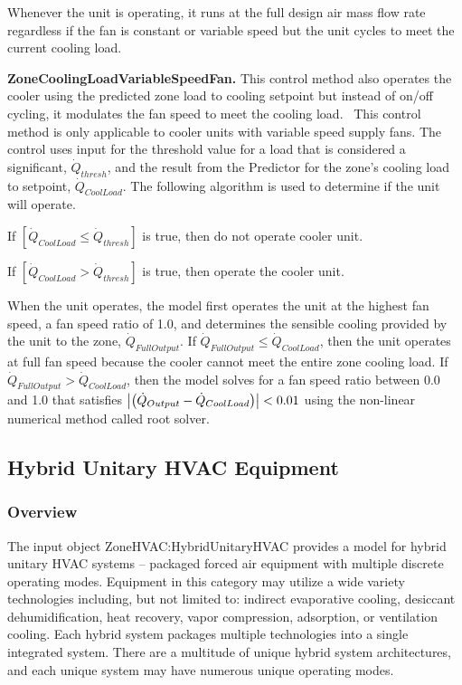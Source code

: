 Whenever the unit is operating, it runs at the full design air mass flow rate regardless if the fan is constant or variable speed but the unit cycles to meet the current cooling load.

\textbf{ZoneCoolingLoadVariableSpeedFan.} This control method also operates the cooler using the predicted zone load to cooling setpoint but instead of on/off cycling, it modulates the fan speed to meet the cooling load.~ This control method is only applicable to cooler units with variable speed supply fans. The control uses input for the threshold value for a load that is considered a significant, \({\dot Q_{thresh}}\), and the result from the Predictor for the zone's cooling load to setpoint, \({\dot Q_{CoolLoad}}\). The following algorithm is used to determine if the unit will operate.

If \(\left[ {{{\dot Q}_{CoolLoad}} \le {{\dot Q}_{thresh}}} \right]\) is true, then do not operate cooler unit.

If \(\left[ {{{\dot Q}_{CoolLoad}} > {{\dot Q}_{thresh}}} \right]\) is true, then operate the cooler unit.

When the unit operates, the model first operates the unit at the highest fan speed, a fan speed ratio of 1.0, and determines the sensible cooling provided by the unit to the zone, $\dot{Q}_{FullOutput}$. If $\dot{Q}_{FullOutput} \leq \dot Q_{CoolLoad}$, then the unit operates at full fan speed because the cooler cannot meet the entire zone cooling load. If $\dot{Q}_{FullOutput} > \dot{Q}_{CoolLoad}$, then the model solves for a fan speed ratio between 0.0 and 1.0 that satisfies $\left|\left(\dot{Q}_{Output}-\dot{Q}_{CoolLoad}\right)\right| < 0.01$ using the non-linear numerical method called root solver.

\subsection{Hybrid Unitary HVAC Equipment}

\subsubsection{Overview}
The input object ZoneHVAC:HybridUnitaryHVAC provides a model for hybrid unitary HVAC systems – packaged forced air equipment with multiple discrete operating modes. Equipment in this category may utilize a wide variety technologies including, but not limited to: indirect evaporative cooling, desiccant dehumidification, heat recovery, vapor compression, adsorption, or ventilation cooling. Each hybrid system packages multiple technologies into a single integrated system. There are a multitude of unique hybrid system architectures, and each unique system may have numerous unique operating modes.

